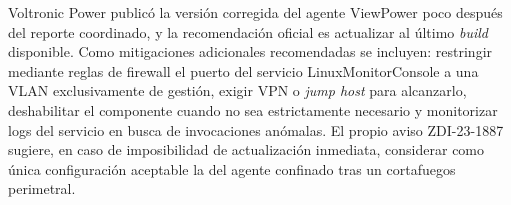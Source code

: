 Voltronic Power publicó la versión corregida del agente ViewPower poco después del reporte coordinado, y la recomendación oficial es actualizar al último \textit{build} disponible. Como mitigaciones adicionales recomendadas se incluyen: restringir mediante reglas de firewall el puerto del servicio LinuxMonitorConsole a una VLAN exclusivamente de gestión, exigir VPN o \textit{jump host} para alcanzarlo, deshabilitar el componente cuando no sea estrictamente necesario y monitorizar logs del servicio en busca de invocaciones anómalas. El propio aviso ZDI-23-1887 sugiere, en caso de imposibilidad de actualización inmediata, considerar como única configuración aceptable la del agente confinado tras un cortafuegos perimetral.
